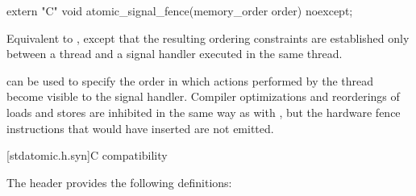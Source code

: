%
\begin{itemdecl}
extern "C" void atomic_signal_fence(memory_order order) noexcept;
\end{itemdecl}

\begin{itemdescr}
\pnum
\effects
Equivalent to , except that
the resulting ordering constraints are established only between a thread and a
signal handler executed in the same thread.

\pnum
\begin{note}
 can be used to specify the order in which actions
performed by the thread become visible to the signal handler.
Compiler optimizations and reorderings of loads and stores are inhibited in
the same way as with , but the hardware fence instructions
that  would have inserted are not emitted.
\end{note}
\end{itemdescr}

[stdatomic.h.syn]{C compatibility}

The header  provides the following definitions:

